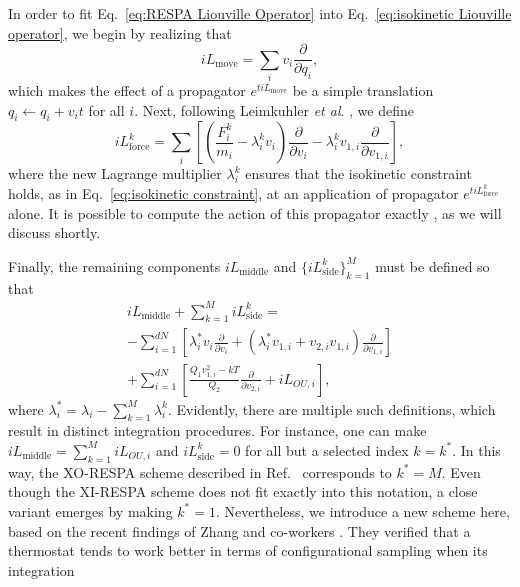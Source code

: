 \documentclass[
    journal=jctcce,
    layout=twocolumn
]{achemso}
\newcommand{\diff}[2]{\frac{\partial #2}{\partial #1}} %
\newcommand{\dof}{i}   %
\newcommand{\Liu}{i\!L}
\begin{document}
In order to fit Eq.~\eqref{eq:RESPA Liouville Operator} into Eq.~\eqref{eq:isokinetic Liouville operator}, we begin by realizing that
\begin{equation}
\Liu_\mathrm{move} = \sum_\dof v_\dof \diff{q_\dof}{},
\end{equation}
which makes the effect of a propagator $e^{t \Liu_\mathrm{move}}$ be a simple translation $q_\dof \leftarrow q_\dof + v_\dof t$ for all $\dof$.
Next, following Leimkuhler \textit{et al}. \cite{Leimkuhler_2013}, we define
\begin{equation}
\label{eq:force-dependent Liouville operator}
\Liu_\mathrm{force}^k = \sum_\dof \left[\left(\frac{F^k_\dof}{m_\dof} - \lambda^k_\dof v_\dof \right)\diff{v_\dof}{} - \lambda^k_\dof v_{1,\dof} \diff{v_{1,\dof}}{}\right],
\end{equation}
where the new Lagrange multiplier $\lambda^k_\dof$ ensures that the isokinetic constraint holds, as in Eq.~\eqref{eq:isokinetic constraint}, at an application of propagator $e^{t \Liu_\mathrm{force}^k}$ alone.
It is possible to compute the action of this propagator exactly \cite{Minary_2003, Leimkuhler_2013}, as we will discuss shortly.

Finally, the remaining components $\Liu_\mathrm{middle}$ and $\{\Liu_\mathrm{side}^k\}_{k=1}^M$ must be defined so that
\begin{multline}
\Liu_\mathrm{middle} + \sum_{k=1}^M \Liu_\mathrm{side}^k = \\
- \sum_{\dof=1}^{dN} \left[ \lambda^\ast_\dof v_\dof\diff{v_\dof}{} + \left(\lambda^\ast_\dof v_{1,\dof} + v_{2,\dof} v_{1,\dof}\right)\diff{v_{1,\dof}}{} \right] \\
+ \sum_{\dof=1}^{dN} \left[\tfrac{Q_1 v_{1,\dof}^2 - kT}{Q_2}\diff{v_{2,\dof}}{}
+ \Liu_{OU,\dof} \right],
\end{multline}
where $\lambda^\ast_\dof = \lambda_\dof - \sum_{k=1}^M \lambda^k_\dof$.
Evidently, there are multiple such definitions, which result in distinct integration procedures.
For instance, one can make $\Liu_\mathrm{middle} = \sum_{k=1}^M \Liu_{OU,\dof}$ and $\Liu_\mathrm{side}^k = 0$ for all but a selected index $k = k^\ast$.
In this way, the XO-RESPA scheme described in Ref.~ corresponds to $k^\ast = M$.
Even though the XI-RESPA scheme \cite{Leimkuhler_2013} does not fit exactly into this notation, a close variant emerges by making $k^\ast = 1$.
Nevertheless, we introduce a new scheme here, based on the recent findings of Zhang and co-workers \cite{Zhang_2017}.
They verified that a thermostat tends to work better in terms of configurational sampling when its integration 
\end{document}
